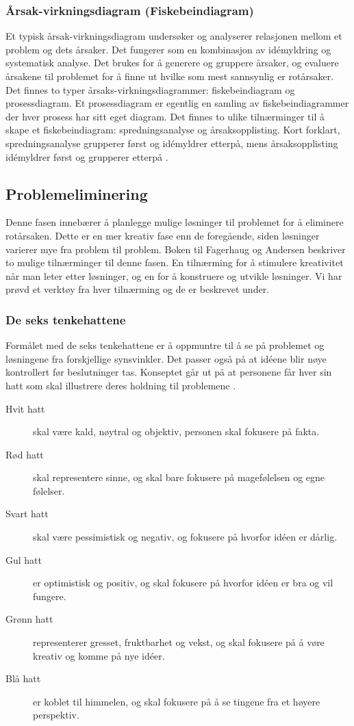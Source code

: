 \subsubsection{Årsak-virkningsdiagram (Fiskebeindiagram)}
Et typisk årsak-virkningsdiagram undersøker og analyserer relasjonen mellom et problem og dets årsaker. Det fungerer som en kombinasjon av idémyldring og systematisk analyse. Det brukes for å generere og gruppere årsaker, og evaluere årsakene til problemet for å finne ut hvilke som mest sannsynlig er rotårsaker. Det finnes to typer årsaks-virkningsdiagrammer: fiskebeindiagram og prosessdiagram. Et prosessdiagram er egentlig en samling av fiskebeindiagrammer der hver prosess har sitt eget diagram. Det finnes to ulike tilnærminger til å skape et fiskebeindiagram: spredningsanalyse og årsaksopplisting. Kort forklart, spredningsanalyse grupperer først og idémyldrer etterpå, mens årsaksopplisting idémyldrer først og grupperer etterpå \cite{RCA}. 

\subsection{Problemeliminering}
Denne fasen innebærer å planlegge mulige løsninger til problemet for å eliminere rotårsaken. Dette er en mer kreativ fase enn de foregående, siden løsninger varierer mye fra problem til problem. Boken til Fagerhaug og Andersen \cite{RCA} beskriver to mulige tilnærminger til denne fasen. En tilnærming for å stimulere kreativitet når man leter etter løsninger, og en for å konstruere og utvikle løsninger. Vi har prøvd et verktøy fra hver tilnærming og de er beskrevet under. 

\subsubsection{De seks tenkehattene}
Formålet med de seks tenkehattene er å oppmuntre til å se på problemet og løsningene fra forskjellige synsvinkler. Det passer også på at idéene blir nøye kontrollert før beslutninger tas. Konseptet går ut på at personene får hver sin hatt som skal illustrere deres holdning til problemene \cite{RCA}. 

\begin{description}
    \item[Hvit hatt] skal være kald, nøytral og objektiv, personen skal fokusere på fakta.
    \item[Rød hatt] skal representere sinne, og skal bare fokusere på magefølelsen og egne følelser.
    \item[Svart hatt] skal være pessimistisk og negativ, og fokusere på hvorfor idéen er dårlig.
    \item[Gul hatt] er optimistisk og positiv, og skal fokusere på hvorfor idéen er bra og vil fungere.
    \item[Grønn hatt] representerer gresset, fruktbarhet og vekst, og skal fokusere på å vøre kreativ og komme på nye idéer.
    \item[Blå hatt] er koblet til himmelen, og skal fokusere på å se tingene fra et høyere perspektiv.
\end{description}

